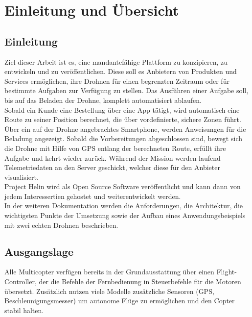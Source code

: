 \chapter{Einleitung und Übersicht}

\section{Einleitung}

Ziel dieser Arbeit ist es, eine mandantefähige Plattform zu konzipieren, zu entwickeln und zu veröffentlichen. Diese soll es Anbietern von Produkten und Services ermöglichen, ihre Drohnen für einen begrenzten Zeitraum oder für bestimmte Aufgaben zur Verfügung zu stellen. Das Ausführen einer Aufgabe soll, bis auf das Beladen der Drohne, komplett automatisiert ablaufen. \\

Sobald ein Kunde eine Bestellung über eine App tätigt, wird automatisch eine Route zu seiner Position berechnet, die über vordefinierte, sichere Zonen führt. Über ein auf der Drohne angebrachtes Smartphone, werden Anweisungen für die Beladung angezeigt. Sobald die Vorbereitungen abgeschlossen sind, bewegt sich die Drohne mit Hilfe von GPS entlang der berechneten Route, erfüllt ihre Aufgabe und kehrt wieder zurück. Während der Mission werden laufend Telemetriedaten an den Server geschickt, welcher diese für den Anbieter visualisiert.\\

Project Helin wird als Open Source Software veröffentlicht und kann dann von jedem Interessertien gehostet und weiterentwickelt werden.\\

In der weiteren Dokumentation werden die Anforderungen, die Architektur, die wichtigsten Punkte der Umsetzung sowie der Aufbau eines Anwendungsbeispiels mit zwei echten Drohnen beschrieben.

\section{Ausgangslage}

Alle Multicopter verfügen bereits in der Grundausstattung über einen \Gls{Flight-Controller}, der die Befehle der Fernbedienung in Steuerbefehle für die Motoren übersetzt. Zusätzlich nutzen viele Modelle zusätzliche Sensoren (GPS, Beschleunigungsmesser) um autonome Flüge zu ermöglichen und den Copter stabil halten. \\

